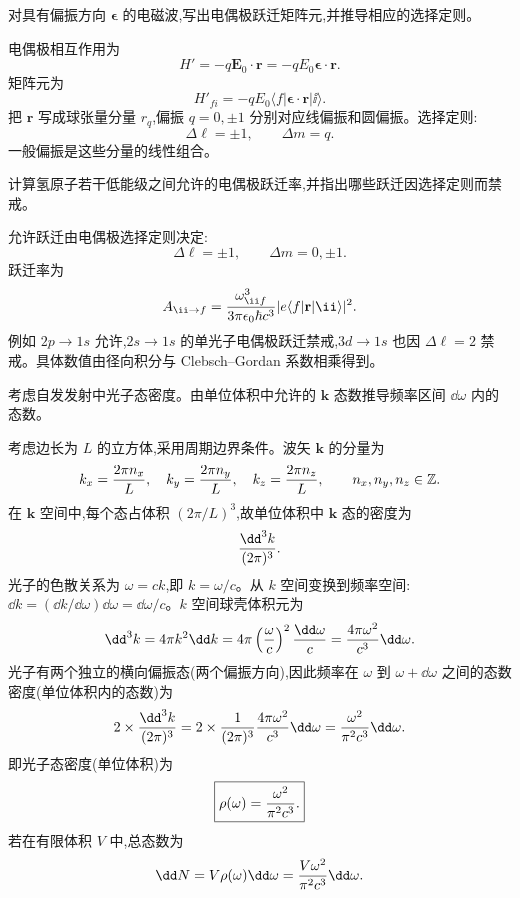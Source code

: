 \begin{question}
对具有偏振方向 $\boldsymbol\epsilon$ 的电磁波,写出电偶极跃迁矩阵元,并推导相应的选择定则。
\begin{solution}
电偶极相互作用为
\[
H'=-q\mathbf E_0\cdot\mathbf r=-qE_0\boldsymbol\epsilon\cdot\mathbf r.
\]
矩阵元为
\[
H'_{fi}=-qE_0\langle f|\boldsymbol\epsilon\cdot\mathbf r|\ii\rangle.
\]
把 $\mathbf r$ 写成球张量分量 $r_q$,偏振 $q=0,\pm1$ 分别对应线偏振和圆偏振。选择定则:
\[
\Delta\ell=\pm1,
\qquad
\Delta m=q.
\]
一般偏振是这些分量的线性组合。
\end{solution}
\end{question}

\begin{question}
计算氢原子若干低能级之间允许的电偶极跃迁率,并指出哪些跃迁因选择定则而禁戒。
\begin{solution}
允许跃迁由电偶极选择定则决定:
\[
\Delta\ell=\pm1,
\qquad \Delta m=0,\pm1.
\]
跃迁率为
\[
A_{\ii\to f}={\omega_{\ii f}^3\over3\pi\epsilon_0\hbar c^3}|e\langle f|\mathbf r|\ii\rangle|^2.
\]
例如 $2p\to1s$ 允许,$2s\to1s$ 的单光子电偶极跃迁禁戒,$3d\to1s$ 也因 $\Delta\ell=2$ 禁戒。具体数值由径向积分与 Clebsch--Gordan 系数相乘得到。
\end{solution}
\end{question}

\begin{question}
考虑自发发射中光子态密度。由单位体积中允许的 $\mathbf k$ 态数推导频率区间 $\dd\omega$ 内的态数。
\begin{solution}
考虑边长为 $L$ 的立方体,采用周期边界条件。波矢 $\mathbf k$ 的分量为
\[
k_x={2\pi n_x\over L},\quad k_y={2\pi n_y\over L},\quad k_z={2\pi n_z\over L},\qquad n_x,n_y,n_z\in\mathbb Z.
\]
在 $\mathbf k$ 空间中,每个态占体积 $(2\pi/L)^3$,故单位体积中 $\mathbf k$ 态的密度为
\[
{\dd^3k\over(2\pi)^3}.
\]
光子的色散关系为 $\omega=ck$,即 $k=\omega/c$。从 $k$ 空间变换到频率空间:$\dd k=(\dd k/\dd\omega)\dd\omega=\dd\omega/c$。$k$ 空间球壳体积元为
\[
\dd^3k=4\pi k^2\dd k=4\pi\left({\omega\over c}\right)^2{\dd\omega\over c}
={4\pi\omega^2\over c^3}\dd\omega.
\]
光子有两个独立的横向偏振态(两个偏振方向),因此频率在 $\omega$ 到 $\omega+\dd\omega$ 之间的态数密度(单位体积内的态数)为
\[
2\times{\dd^3k\over(2\pi)^3}
=2\times{1\over(2\pi)^3}{4\pi\omega^2\over c^3}\dd\omega
={\omega^2\over\pi^2c^3}\dd\omega.
\]
即光子态密度(单位体积)为
\[
\boxed{\rho(\omega)={\omega^2\over\pi^2c^3}.}
\]
若在有限体积 $V$ 中,总态数为
\[
\dd N=V\rho(\omega)\dd\omega={V\omega^2\over\pi^2c^3}\dd\omega.
\]
\end{solution}
\end{question}

